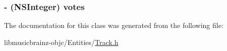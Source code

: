 \hypertarget{interface_track_af501aaab88ac8b70f30fc149dee01502}{
\subsubsection[{votes}]{\setlength{\rightskip}{0pt plus 5cm}-\/ (N\-S\-Integer) {\bf votes}}}\label{interface_track_af501aaab88ac8b70f30fc149dee01502}


The documentation for this class was generated from the following file\-:\begin{DoxyCompactItemize}
\item 
libmusicbrainz-\/objc/\-Entities/\hyperlink{_track_8h}{Track.\-h}\end{DoxyCompactItemize}
